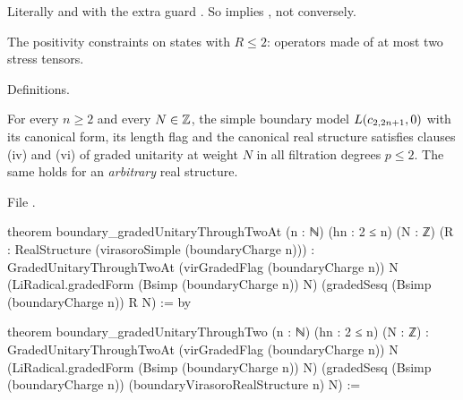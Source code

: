 \begin{dictionary}
Literally  and  with the extra guard . So
 implies , not conversely.
\end{dictionary}

\begin{physics}
The positivity constraints on states with $R\le2$: operators made of at most two stress tensors.
\end{physics}

\begin{status}
Definitions.
\end{status}

\begin{theorem}\label{l19:thm:throughtwo}
For every $n\ge2$ and every $N\in{\mathbb{Z}}$, the simple boundary model $L(c_{2,2n+1},0)$ with its canonical
form, its length flag and the canonical real structure satisfies clauses (iv) and (vi) of graded
unitarity at weight $N$ in all filtration degrees $p\le2$. The same holds for an \emph{arbitrary} real
structure.
\end{theorem}

\noindent File .
\begin{leancode}
theorem boundary_gradedUnitaryThroughTwoAt (n : ℕ) (hn : 2 ≤ n) (N : ℤ)
    (R : RealStructure (virasoroSimple (boundaryCharge n))) :
    GradedUnitaryThroughTwoAt (virGradedFlag (boundaryCharge n)) N
      (LiRadical.gradedForm (Bsimp (boundaryCharge n)) N)
      (gradedSesq (Bsimp (boundaryCharge n)) R N) := by

theorem boundary_gradedUnitaryThroughTwo (n : ℕ) (hn : 2 ≤ n) (N : ℤ) :
    GradedUnitaryThroughTwoAt (virGradedFlag (boundaryCharge n)) N
      (LiRadical.gradedForm (Bsimp (boundaryCharge n)) N)
      (gradedSesq (Bsimp (boundaryCharge n)) (boundaryVirasoroRealStructure n) N) :=
\end{leancode}

